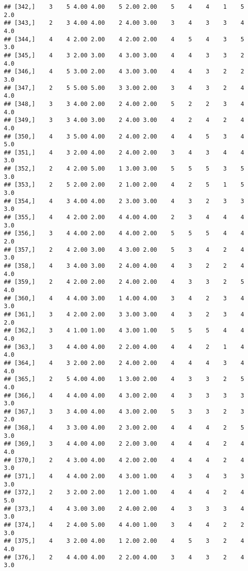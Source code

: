 \documentclass[]{article}
\begin{document}
\begin{verbatim}
## [342,]    3    5 4.00 4.00    5 2.00 2.00    5    4    4    1    5  2.0
## [343,]    2    3 4.00 4.00    2 4.00 3.00    3    4    3    3    4  4.0
## [344,]    4    4 2.00 2.00    4 2.00 2.00    4    5    4    3    5  3.0
## [345,]    4    3 2.00 3.00    4 3.00 3.00    4    4    3    3    2  4.0
## [346,]    4    5 3.00 2.00    4 3.00 3.00    4    4    3    2    2  3.0
## [347,]    2    5 5.00 5.00    3 3.00 2.00    3    4    3    2    4  4.0
## [348,]    3    3 4.00 2.00    2 4.00 2.00    5    2    2    3    4  4.0
## [349,]    3    3 4.00 3.00    2 4.00 3.00    4    2    4    2    4  4.0
## [350,]    4    3 5.00 4.00    2 4.00 2.00    4    4    5    3    4  5.0
## [351,]    4    3 2.00 4.00    2 4.00 2.00    3    4    3    4    4  3.0
## [352,]    2    4 2.00 5.00    1 3.00 3.00    5    5    5    3    5  3.0
## [353,]    2    5 2.00 2.00    2 1.00 2.00    4    2    5    1    5  3.0
## [354,]    4    3 4.00 4.00    2 3.00 3.00    4    3    2    3    3  3.0
## [355,]    4    4 2.00 2.00    4 4.00 4.00    2    3    4    4    4  3.0
## [356,]    3    4 4.00 2.00    4 4.00 2.00    5    5    5    4    4  2.0
## [357,]    2    4 2.00 3.00    4 3.00 2.00    5    3    4    2    4  3.0
## [358,]    4    3 4.00 3.00    2 4.00 4.00    4    3    2    2    4  4.0
## [359,]    2    4 2.00 2.00    2 4.00 2.00    4    3    3    2    5  4.0
## [360,]    4    4 4.00 3.00    1 4.00 4.00    3    4    2    3    4  3.0
## [361,]    3    4 2.00 2.00    3 3.00 3.00    4    3    2    3    4  2.0
## [362,]    3    4 1.00 1.00    4 3.00 1.00    5    5    5    4    4  4.0
## [363,]    3    4 4.00 4.00    2 2.00 4.00    4    4    2    1    4  4.0
## [364,]    4    3 2.00 2.00    2 4.00 2.00    4    4    4    3    4  4.0
## [365,]    2    5 4.00 4.00    1 3.00 2.00    4    3    3    2    5  4.0
## [366,]    4    4 4.00 4.00    4 3.00 2.00    4    3    3    3    3  3.0
## [367,]    3    3 4.00 4.00    4 3.00 2.00    5    3    3    2    3  2.0
## [368,]    4    3 3.00 4.00    2 3.00 2.00    4    4    4    2    5  3.0
## [369,]    3    4 4.00 4.00    2 2.00 3.00    4    4    4    2    4  4.0
## [370,]    2    4 3.00 4.00    4 2.00 2.00    4    4    4    2    4  3.0
## [371,]    4    4 4.00 2.00    4 3.00 1.00    4    3    4    3    3  3.0
## [372,]    2    3 2.00 2.00    1 2.00 1.00    4    4    4    2    4  5.0
## [373,]    4    4 3.00 3.00    2 4.00 2.00    4    3    3    3    4  3.0
## [374,]    4    2 4.00 5.00    4 4.00 1.00    3    4    4    2    2  3.0
## [375,]    4    3 2.00 4.00    1 2.00 2.00    4    5    3    2    4  4.0
## [376,]    2    4 4.00 4.00    2 2.00 4.00    3    4    3    2    4  3.0

\end{verbatim}
\end{document}
